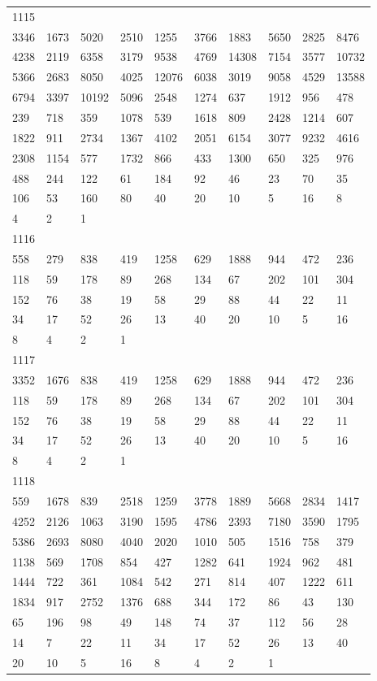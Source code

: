 \begin{longtable}{*{10}{l}}
1115&&&&&&&&&\\
3346& 1673& 5020& 2510& 1255& 3766& 1883& 5650& 2825& 8476\\
4238& 2119& 6358& 3179& 9538& 4769& 14308& 7154& 3577& 10732\\
5366& 2683& 8050& 4025& 12076& 6038& 3019& 9058& 4529& 13588\\
6794& 3397& 10192& 5096& 2548& 1274& 637& 1912& 956& 478\\
239& 718& 359& 1078& 539& 1618& 809& 2428& 1214& 607\\
1822& 911& 2734& 1367& 4102& 2051& 6154& 3077& 9232& 4616\\
2308& 1154& 577& 1732& 866& 433& 1300& 650& 325& 976\\
488& 244& 122& 61& 184& 92& 46& 23& 70& 35\\
106& 53& 160& 80& 40& 20& 10& 5& 16& 8\\
4& 2& 1& \\

1116&&&&&&&&&\\
558& 279& 838& 419& 1258& 629& 1888& 944& 472& 236\\
118& 59& 178& 89& 268& 134& 67& 202& 101& 304\\
152& 76& 38& 19& 58& 29& 88& 44& 22& 11\\
34& 17& 52& 26& 13& 40& 20& 10& 5& 16\\
8& 4& 2& 1& \\

1117&&&&&&&&&\\
3352& 1676& 838& 419& 1258& 629& 1888& 944& 472& 236\\
118& 59& 178& 89& 268& 134& 67& 202& 101& 304\\
152& 76& 38& 19& 58& 29& 88& 44& 22& 11\\
34& 17& 52& 26& 13& 40& 20& 10& 5& 16\\
8& 4& 2& 1& \\

1118&&&&&&&&&\\
559& 1678& 839& 2518& 1259& 3778& 1889& 5668& 2834& 1417\\
4252& 2126& 1063& 3190& 1595& 4786& 2393& 7180& 3590& 1795\\
5386& 2693& 8080& 4040& 2020& 1010& 505& 1516& 758& 379\\
1138& 569& 1708& 854& 427& 1282& 641& 1924& 962& 481\\
1444& 722& 361& 1084& 542& 271& 814& 407& 1222& 611\\
1834& 917& 2752& 1376& 688& 344& 172& 86& 43& 130\\
65& 196& 98& 49& 148& 74& 37& 112& 56& 28\\
14& 7& 22& 11& 34& 17& 52& 26& 13& 40\\
20& 10& 5& 16& 8& 4& 2& 1& \\


\end{longtable}

